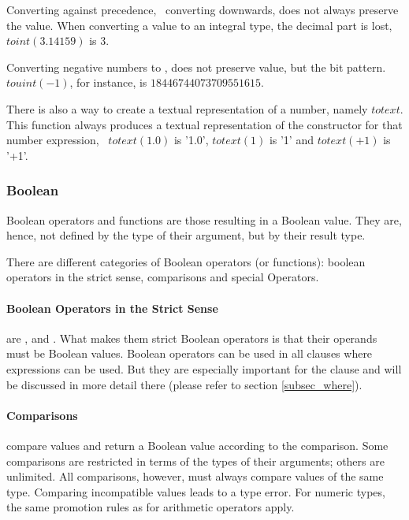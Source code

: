 Converting against precedence,
\ie\ converting downwards,
does not always preserve the value.
When converting a 
value to an integral type, the decimal part
is lost, \eg\ $toint(3.14159)$ is 3.

Converting negative numbers to ,
does not preserve value, but the bit pattern.
$touint(-1)$, for instance, is
$18446744073709551615$.

There is also a way to create a textual
representation of a number, namely $totext$.
This function always produces a textual
representation of the constructor for that
number expression,
\eg\ $totext(1.0)$ is '1.0',
$totext(1)$ is '1' and
$totext(+1)$ is '+1'.

\subsubsection{Boolean}

Boolean operators and functions
are those resulting in a Boolean value.
They are, hence, not defined by the type
of their argument, but by their result type.

There are different categories of Boolean
operators (or functions):
boolean operators in the strict sense,
comparisons and special Operators.

\paragraph{Boolean Operators in the Strict Sense}
are ,  and .
What makes them strict Boolean operators is
that their operands must be Boolean values.
Boolean operators can be used in all clauses
where expressions can be used.
But they are especially important for the
 clause and will be discussed
in more detail there (please refer to section
\ref{subsec_where}).

\paragraph{Comparisons}
compare values and return
a Boolean value according to the comparison.
Some comparisons are restricted in terms
of the types of their arguments;
others are unlimited. All comparisons, however,
must always compare values of the same type.
Comparing incompatible values leads to a type error.
For numeric types, the same promotion rules
as for arithmetic operators apply.

